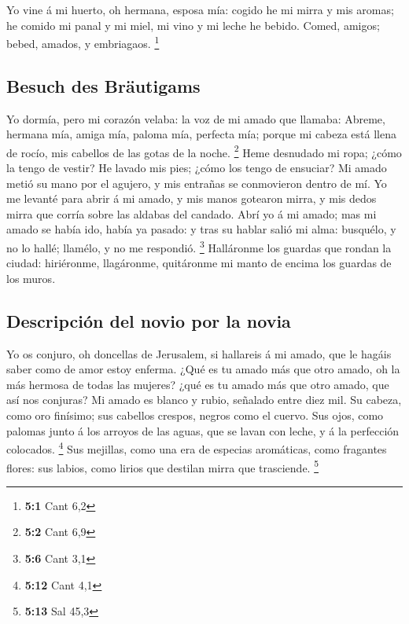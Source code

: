  Yo vine á mi huerto, oh hermana, esposa mía: cogido he mi
mirra y mis aromas; he comido mi panal y mi miel, mi vino y mi leche he
bebido. Comed, amigos; bebed, amados, y embriagaos. \footnote{\textbf{5:1}
  Cant 6,2}

\hypertarget{besuch-des-bruxe4utigams}{%
\subsection{Besuch des Bräutigams}\label{besuch-des-bruxe4utigams}}

 Yo dormía, pero mi corazón velaba: la voz de mi amado que
llamaba: Abreme, hermana mía, amiga mía, paloma mía, perfecta mía;
porque mi cabeza está llena de rocío, mis cabellos de las gotas de la
noche. \footnote{\textbf{5:2} Cant 6,9}  Heme desnudado mi
ropa; ¿cómo la tengo de vestir? He lavado mis pies; ¿cómo los tengo de
ensuciar?  Mi amado metió su mano por el agujero, y mis
entrañas se conmovieron dentro de mí.  Yo me levanté para
abrir á mi amado, y mis manos gotearon mirra, y mis dedos mirra que
corría sobre las aldabas del candado.  Abrí yo á mi amado;
mas mi amado se había ido, había ya pasado: y tras su hablar salió mi
alma: busquélo, y no lo hallé; llamélo, y no me respondió. \footnote{\textbf{5:6}
  Cant 3,1}  Halláronme los guardas que rondan la ciudad:
hiriéronme, llagáronme, quitáronme mi manto de encima los guardas de los
muros.

\hypertarget{descripciuxf3n-del-novio-por-la-novia}{%
\subsection{Descripción del novio por la
novia}\label{descripciuxf3n-del-novio-por-la-novia}}

 Yo os conjuro, oh doncellas de Jerusalem, si hallareis á mi
amado, que le hagáis saber como de amor estoy enferma.  ¿Qué
es tu amado más que otro amado, oh la más hermosa de todas las mujeres?
¿qué es tu amado más que otro amado, que así nos conjuras? 
Mi amado es blanco y rubio, señalado entre diez mil.  Su
cabeza, como oro finísimo; sus cabellos crespos, negros como el cuervo.
 Sus ojos, como palomas junto á los arroyos de las aguas,
que se lavan con leche, y á la perfección colocados. \footnote{\textbf{5:12}
  Cant 4,1}  Sus mejillas, como una era de especias
aromáticas, como fragantes flores: sus labios, como lirios que destilan
mirra que trasciende. \footnote{\textbf{5:13} Sal 45,3}

